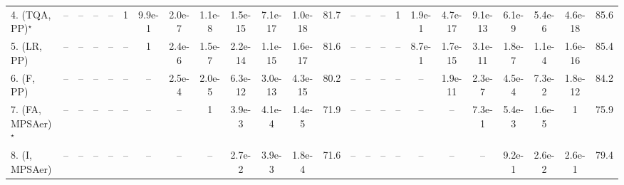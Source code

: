 \begin{table}[ht]
{\begin{tabular}{l|cccccccccccc|ccccccccccc|}
4. (TQA, PP)$^\star$ & -- & -- & -- & -- & 1 & 9.9e-1 & {\cellcolor[HTML]{00441B}} \color[HTML]{F1F1F1} 2.0e-7 & {\cellcolor[HTML]{00441B}} \color[HTML]{F1F1F1} 1.1e-8 & {\cellcolor[HTML]{00441B}} \color[HTML]{F1F1F1} 1.5e-15 & {\cellcolor[HTML]{00441B}} \color[HTML]{F1F1F1} 7.1e-17 & {\cellcolor[HTML]{00441B}} \color[HTML]{F1F1F1} 1.0e-18 & 81.7 & -- & -- & -- & 1 & 1.9e-1 & {\cellcolor[HTML]{00441B}} \color[HTML]{F1F1F1} 4.7e-17 & {\cellcolor[HTML]{00441B}} \color[HTML]{F1F1F1} 9.1e-13 & {\cellcolor[HTML]{00441B}} \color[HTML]{F1F1F1} 6.1e-9 & {\cellcolor[HTML]{00441B}} \color[HTML]{F1F1F1} 5.4e-6 & {\cellcolor[HTML]{00441B}} \color[HTML]{F1F1F1} 4.6e-18 & 85.6 \\
5. (LR, PP) & -- & -- & -- & -- & -- & 1 & {\cellcolor[HTML]{00441B}} \color[HTML]{F1F1F1} 2.4e-6 & {\cellcolor[HTML]{00441B}} \color[HTML]{F1F1F1} 1.5e-7 & {\cellcolor[HTML]{00441B}} \color[HTML]{F1F1F1} 2.2e-14 & {\cellcolor[HTML]{00441B}} \color[HTML]{F1F1F1} 1.1e-15 & {\cellcolor[HTML]{00441B}} \color[HTML]{F1F1F1} 1.6e-17 & 81.6 & -- & -- & -- & -- & 8.7e-1 & {\cellcolor[HTML]{00441B}} \color[HTML]{F1F1F1} 1.7e-15 & {\cellcolor[HTML]{00441B}} \color[HTML]{F1F1F1} 3.1e-11 & {\cellcolor[HTML]{00441B}} \color[HTML]{F1F1F1} 1.8e-7 & {\cellcolor[HTML]{00441B}} \color[HTML]{F1F1F1} 1.1e-4 & {\cellcolor[HTML]{00441B}} \color[HTML]{F1F1F1} 1.6e-16 & 85.4 \\
6. (F, PP) & -- & -- & -- & -- & -- & -- & {\cellcolor[HTML]{00441B}} \color[HTML]{F1F1F1} 2.5e-4 & {\cellcolor[HTML]{00441B}} \color[HTML]{F1F1F1} 2.0e-5 & {\cellcolor[HTML]{00441B}} \color[HTML]{F1F1F1} 6.3e-12 & {\cellcolor[HTML]{00441B}} \color[HTML]{F1F1F1} 3.0e-13 & {\cellcolor[HTML]{00441B}} \color[HTML]{F1F1F1} 4.3e-15 & 80.2 & -- & -- & -- & -- & -- & {\cellcolor[HTML]{00441B}} \color[HTML]{F1F1F1} 1.9e-11 & {\cellcolor[HTML]{00441B}} \color[HTML]{F1F1F1} 2.3e-7 & {\cellcolor[HTML]{00441B}} \color[HTML]{F1F1F1} 4.5e-4 & 7.3e-2 & {\cellcolor[HTML]{00441B}} \color[HTML]{F1F1F1} 1.8e-12 & 84.2 \\
7. (FA, MPSAer)$^\star$ & -- & -- & -- & -- & -- & -- & -- & 1 & {\cellcolor[HTML]{309950}} \color[HTML]{F1F1F1} 3.9e-3 & {\cellcolor[HTML]{00441B}} \color[HTML]{F1F1F1} 4.1e-4 & {\cellcolor[HTML]{00441B}} \color[HTML]{F1F1F1} 1.4e-5 & 71.9 & -- & -- & -- & -- & -- & -- & 7.3e-1 & {\cellcolor[HTML]{309950}} \color[HTML]{F1F1F1} 5.4e-3 & {\cellcolor[HTML]{00441B}} \color[HTML]{F1F1F1} 1.6e-5 & 1 & 75.9 \\
8. (I, MPSAer) & -- & -- & -- & -- & -- & -- & -- & -- & {\cellcolor[HTML]{B5E1AE}} \color[HTML]{000000} 2.7e-2 & {\cellcolor[HTML]{309950}} \color[HTML]{F1F1F1} 3.9e-3 & {\cellcolor[HTML]{00441B}} \color[HTML]{F1F1F1} 1.8e-4 & 71.6 & -- & -- & -- & -- & -- & -- & -- & 9.2e-1 & {\cellcolor[HTML]{B5E1AE}} \color[HTML]{000000} 2.6e-2 & 2.6e-1 & 79.4 \\

\end{tabular}}
\end{table}
